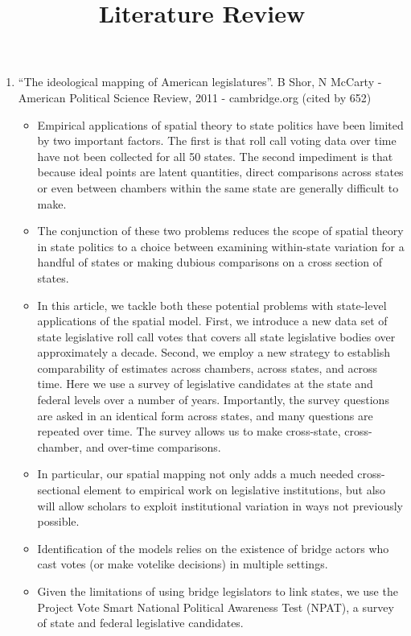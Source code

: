 \documentclass[a4paper,12pt]{article}
\begin{document}
\title{Literature Review}
\maketitle


\begin{enumerate}
\item “The ideological mapping of American legislatures”. B Shor, N McCarty - American Political Science Review, 2011 - cambridge.org (cited by 652)
\begin{itemize}
\item Empirical applications of spatial theory to state politics have been limited by two important factors. The first is that roll call voting data over time have not been collected for all 50 states. The second impediment is that because ideal points are latent quantities, direct comparisons across states or even between chambers within the same state are generally difficult to make. 
\item The conjunction of these two problems reduces the scope of spatial theory in state politics to a choice between examining within-state variation for a handful of states or making dubious comparisons on a cross section of states. 
\item In this article, we tackle both these potential problems with state-level applications of the spatial model. First, we introduce a new data set of state legislative roll call votes that covers all state legislative bodies over approximately a decade. Second, we employ a new strategy to establish comparability of estimates across chambers, across states, and across time. Here we use a survey of legislative candidates at the state and federal levels over a number of years. Importantly, the survey questions are asked in an identical form across states, and many questions are repeated over time. The survey allows us to make cross-state, cross-chamber, and over-time comparisons. 
\item In particular, our spatial mapping not only adds a much needed cross-sectional element to empirical work on legislative institutions, but also will allow scholars to exploit institutional variation in ways not previously possible. 
\item Identification of the models relies on the existence of bridge actors who cast votes (or make votelike decisions) in multiple settings. 
\item Given the limitations of using bridge legislators to link states, we use the Project Vote Smart National Political Awareness Test (NPAT), a survey of state and federal legislative candidates. 

\end{itemize}
\end{enumerate}
\end{document}
